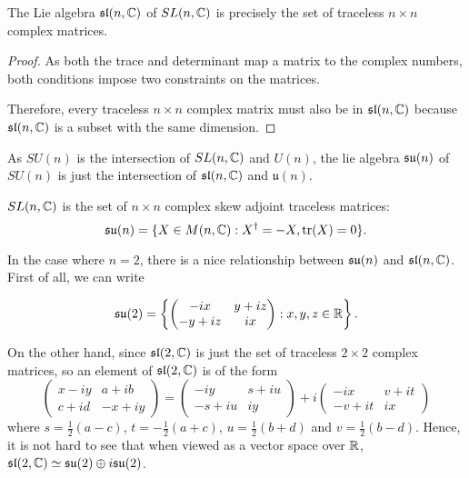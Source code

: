 \documentclass[a4paper]{article}
\begin{document}
\begin{prop}
    The Lie algebra $\mathfrak{sl}(n, \mathbb{C})$ of $SL(n, \mathbb{C})$ is precisely the set of traceless $n \times n$ complex matrices. 
\end{prop}

\begin{proof}
    As both the trace and determinant map a matrix to the complex numbers, both conditions impose two constraints on the matrices. 
    
    Therefore, every traceless $n \times n$ complex matrix must also be in $\mathfrak{sl}(n, \mathbb{C})$ because $\mathfrak{sl}(n, \mathbb{C})$ is a subset with the same dimension.
\end{proof}

As $SU(n)$ is the intersection of $SL(n, \mathbb{C})$ and $U(n)$, the lie algebra $\mathfrak{su}(n)$ of $SU(n)$ is just the intersection of $\mathfrak{sl}(n, \mathbb{C})$ and $\mathfrak{u}(n)$. 

\begin{prop}
    $SL(n, \mathbb{C})$ is the set of $n \times n$ complex skew adjoint traceless matrices: $$\mathfrak{su}(n) = \{X \in M(n, \mathbb{C}) : X^\dagger = -X, \operatorname{tr}(X) = 0\}.$$
\end{prop}

In the case where $n = 2$, there is a nice relationship between $\mathfrak{su}(n)$ and $\mathfrak{sl}(n, \mathbb{C})$. First of all, we can write

$$\mathfrak{su}(2) = \left\{\begin{pmatrix}-ix & y+iz \\ -y + iz & ix\end{pmatrix} : x, y, z \in \mathbb{R}\right\}.$$

On the other hand, since $\mathfrak{sl}(2, \mathbb{C})$ is just the set of traceless $2 \times 2$ complex matrices, so an element of $\mathfrak{sl}(2, \mathbb{C})$ is of the form
$$
\begin{pmatrix}x-i y & a+i b \\ c + id & -x+i y\end{pmatrix} = \begin{pmatrix}-i y & s+i u \\ -s + i u & i y\end{pmatrix} + i\begin{pmatrix}-i x & v+i t \\ -v + i t & i x\end{pmatrix}
$$
where $s = \frac{1}{2}(a - c)$, $t = -\frac{1}{2}(a + c)$, $u = \frac{1}{2}(b + d)$ and $v = \frac{1}{2}(b - d)$. Hence, it is not hard to see that when viewed as a vector space over $\mathbb{R}$, $\mathfrak{sl}(2, \mathbb{C}) \simeq \mathfrak{su}(2) \oplus i \mathfrak{su}(2)$. 
\end{document}
